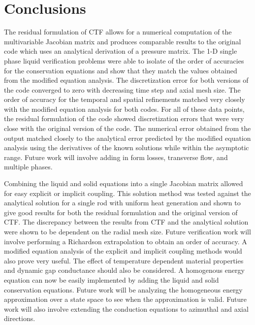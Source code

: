 \vspace*{-80mm}
\chapter{Conclusions} \label{chapter7:uniform_heating}
 

The residual formulation of CTF allows for a numerical computation of the
multivariable Jacobian matrix and produces comparable results to the original
code which uses an analytical derivation of a pressure matrix. The 1-D
single phase liquid verification problems were able to
isolate of the order of accuracies for the conservation equations and show that
they match the values obtained from the modified equation analysis. The
discretization error for both versions of the code converged to zero with
decreasing time step and axial mesh size. The order of accuracy for the temporal
and spatial refinements matched very closely with the modified equation analysis
for both codes. For all of these data points, the residual formulation of the
code showed discretization errors that were very close with the original version
of the code. The numerical error obtained from the output matched closely to
the analytical error predicted by the modified equation analysis using the
derivatives of the known solutions while within the asymptotic range. Future
work will involve adding in form losses, transverse flow, and multiple phases.

Combining the liquid and solid equations into a single Jacobian matrix allowed
for easy explicit or implicit coupling. This solution method was tested against
the analytical solution for a single rod with uniform heat generation and shown
to give good results for both the residual formulation and the original version
of CTF. The discrepancy between the results from CTF and the analytical solution
were shown to be dependent on the radial mesh size. Future verification work
will involve performing a Richardson extrapolation to obtain an order of
accuracy. A modified equation analysis of the explicit and implicit coupling
methods would also prove very useful. The effect of temperature dependent
material properties and dynamic gap conductance should also be considered. A
homogenous energy equation can now be easily implemented by adding the liquid
and solid conservation equations. Future work will be analyzing the homogeneous
energy approximation over a state space to see when the approximation is valid.
Future work will also involve extending the conduction equations to azimuthal
and axial directions.


